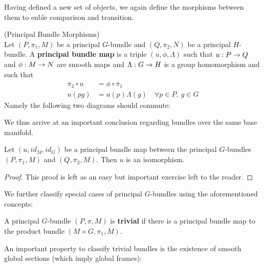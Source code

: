 Having defined a new set of objects, we again define the morphisms between them to enble comparison and transition.

\begin{definition} (Principal Bundle Morphisms)\\
  Let $(P,\pi_1,M)$ be a principal $G$-bundle and $(Q,\pi_2, N)$ be a principal $H$-bundle. A \textbf{principal bundle map} is a triple $(u, \phi, \Lambda)$ such that $u: P \rightarrow Q$ and $\phi: M \ra N$ are smooth maps and $\Lambda: G \rightarrow H$ is a group homomorphism and such that
  \begin{align}
    \pi_2 \circ u &= \phi \circ \pi_1\\
    u(pg) &= u(p) \Lambda(g) \quad \forall p \in P, \ g\in G
  \end{align}
  Namely the following two diagrams should commute:
\end{definition}

We thus arrive at an important conclusion regarding bundles over the same base manifold.

\begin{theo}
  Let $(u,id_M,id_G)$ be a principal bundle map between the principal $G$-bundles $(P,\pi_1,M)$ and $(Q,\pi_2,M)$. Then $u$ is an isomorphism.
\begin{proof}
  This proof is left as an easy but important exercise left to the reader.
\end{proof}
\end{theo}

We further classify special cases of principal $G$-bundles using the aforementioned concepts:

\begin{definition}
  A principal $G$-bundle $(P,\pi,M)$ is \textbf{trivial} if there is a principal bundle map to the product bundle $(M\times G, \pi_1, M)$.
\end{definition}

An important property to classify trivial bundles is the existence of smooth global sections (which imply global frames):

